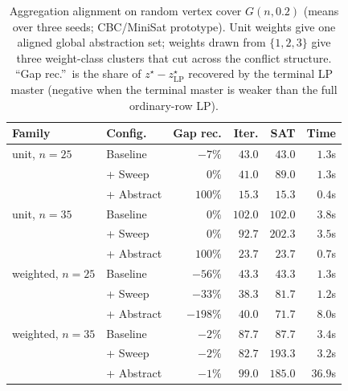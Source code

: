 \begin{table}[htbp]
\centering
\small
\caption{Aggregation alignment on random vertex cover $G(n, 0.2)$
(means over three seeds; CBC/MiniSat prototype). Unit weights give
one aligned global abstraction set; weights drawn from $\{1,2,3\}$ give
three weight-class clusters that cut across the conflict structure.
``Gap rec.''\ is the share of $z^\star - z^\star_{\mathrm{LP}}$ recovered
by the terminal LP master (negative when the terminal master is weaker
than the full ordinary-row LP).}
\label{tab:alignment}
\begin{tabular}{llrrrr}
\toprule
\textbf{Family} & \textbf{Config.} & \textbf{Gap rec.} & \textbf{Iter.} & \textbf{SAT} & \textbf{Time} \\
\midrule
unit, $n{=}25$     & Baseline  & $-7\%$   & $43.0$  & $43.0$  & $1.3$s \\
                   & + Sweep   & $0\%$    & $41.0$  & $89.0$  & $1.3$s \\
                   & + Abstract& $100\%$  & $15.3$  & $15.3$  & $0.4$s \\
\midrule
unit, $n{=}35$     & Baseline  & $0\%$    & $102.0$ & $102.0$ & $3.8$s \\
                   & + Sweep   & $0\%$    & $92.7$  & $202.3$ & $3.5$s \\
                   & + Abstract& $100\%$  & $23.7$  & $23.7$  & $0.7$s \\
\midrule
weighted, $n{=}25$ & Baseline  & $-56\%$  & $43.3$  & $43.3$  & $1.3$s \\
                   & + Sweep   & $-33\%$  & $38.3$  & $81.7$  & $1.2$s \\
                   & + Abstract& $-198\%$ & $40.0$  & $71.7$  & $8.0$s \\
\midrule
weighted, $n{=}35$ & Baseline  & $-2\%$   & $87.7$  & $87.7$  & $3.4$s \\
                   & + Sweep   & $-2\%$   & $82.7$  & $193.3$ & $3.2$s \\
                   & + Abstract& $-1\%$   & $99.0$  & $185.0$ & $36.9$s \\
\bottomrule
\end{tabular}
\end{table}

